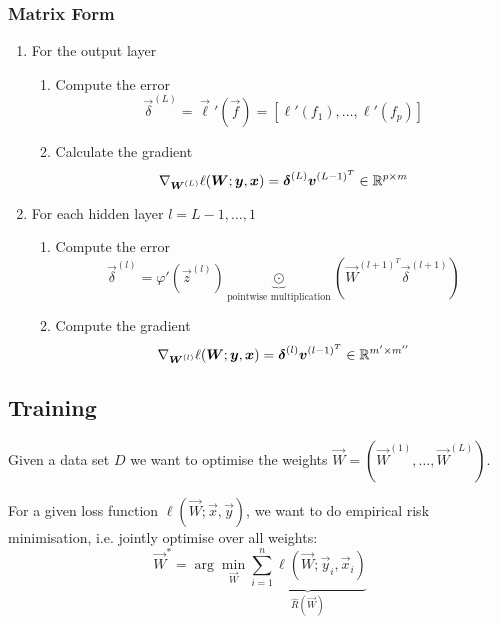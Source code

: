 \subsubsection{Matrix Form}
\begin{enumerate}
    \item For the output layer
    \begin{enumerate}
        \item Compute the error
        \begin{equation*}
            \vec{\delta}^{(L)}
            = \vec{\ell}'(\vec{f})
            = [\ell'(f_1), \dotsc, \ell'(f_p)]
        \end{equation*}
        \item Calculate the gradient
        \begin{equation*}
            \nabla_{\boldsymbol{W}^{(L)}} \ell(\boldsymbol{W}; \boldsymbol{y}, \boldsymbol{x})
            = \boldsymbol{\delta}^{(L)} \boldsymbol{v}^{(L-1)^T}
                \in \mathbb{R}^{p \times m}
        \end{equation*}
    \end{enumerate}
    
    \item For each hidden layer $l = L - 1, \dotsc, 1$
    \begin{enumerate}
        \item Compute the error
        \begin{equation*}
            \vec{\delta}^{(l)}
            = \varphi'(\vec{z}^{(l)}) \underbrace{\odot}_{\text{pointwise multiplication}} 
            (\vec{W}^{(l + 1)^T} \vec{\delta}^{(l + 1)})
        \end{equation*}
        \item Compute the gradient
        \begin{equation*}
            \nabla_{\boldsymbol{W}^{(l)}} \ell(\boldsymbol{W}; \boldsymbol{y}, \boldsymbol{x})
            = \boldsymbol{\delta}^{(l)} \boldsymbol{v}^{(l-1)^T}
            \in \mathbb{R}^{m' \times m''}
        \end{equation*}
    \end{enumerate}
\end{enumerate}


\subsection{Training}
Given a data set $D$ we want to optimise the weights
$\vec{W} = (\vec{W}^{(1)}, \dotsc, \vec{W}^{(L)})$.

For a given loss function $\ell(\vec{W}; \vec{x}, \vec{y})$,
we want to do empirical risk minimisation,
i.e. jointly optimise over all weights:
\begin{equation*}
    \vec{W}^*
    = \arg\min_{\vec{W}}{
        \underbrace{
            \sum_{i=1}^n{\ell(\vec{W}; \vec{y}_i, \vec{x}_i)}
        }_{\hat{R}(\vec{W})}
    }
\end{equation*}

